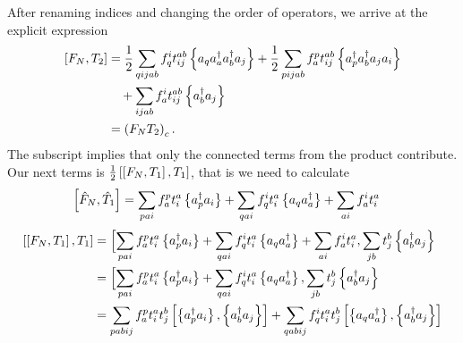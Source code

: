     After renaming indices and changing the order of operators, we arrive at the explicit expression
    \begin{align*}
        \left[ F_N, T_2 \right]
        &= \frac{1}{2} \sum_{qijab} f_q^i t_{ij}^{ab} \left\{a_q a^\dagger_a a^\dagger_b a_j\right\}
        + \frac{1}{2} \sum_{pijab} f_a^p t_{ij}^{ab} \left\{a^\dagger_p a^\dagger_b a_j a_i\right\} \\
        & \quad + \sum_{ijab} f_a^i t_{ij}^{ab} \left\{a^\dagger_b a_j\right\} \\
    &= \left( F_N T_2\right)_c.
    \end{align*}
    The subscript implies that only the connected terms from the product contribute.
Our next terms is  $\frac{1}{2}\left[ \left[ F_N, T_1 \right], T_1 \right]$, that is we need to calculate
        \begin{align*}
        \left[ \hat{F}_N, \hat{T}_1 \right] &= \sum_{pai} f_a^p t_i^a \left\{a_p^\dagger a_i\right\} + 
                \sum_{qai} f_q^i t_i^a \left\{a_q a_a^\dagger\right\} + \sum_{ai} f_a^i t_i^a
        \end{align*}
    \begin{align*}
        \left[ \left[ F_N, T_1 \right], T_1\right] 
        &= \Bigl[ \sum_{pai} f_a^p t_i^a \left\{a_p^\dagger a_i\right\} +
            \sum_{qai} f_q^i t_i^a \left\{a_q a_a^\dagger\right\} + \sum_{ai} f_a^i t_i^a, \sum_{jb} t_j^b \left\{a_b^\dagger a_j\right\} \\
        &= \Bigl[ \sum_{pai} f_a^p t_i^a \left\{a_p^\dagger a_i\right\} +
            \sum_{qai} f_q^i t_i^a \left\{a_q a_a^\dagger\right\}, \sum_{jb} t_j^b \left\{a_b^\dagger a_j\right\} \\
        &= \sum_{pabij} f_a^p t_i^a t_j^b \left[ \left\{a_p^\dagger a_i\right\}, \left\{a_b^\dagger a_j\right\} \right] +
            \sum_{qabij} f_q^i t_i^a t_j^b \left[ \left\{a_q a_a^\dagger\right\}, \left\{a_b^\dagger a_j\right\} \right]
    \end{align*}
